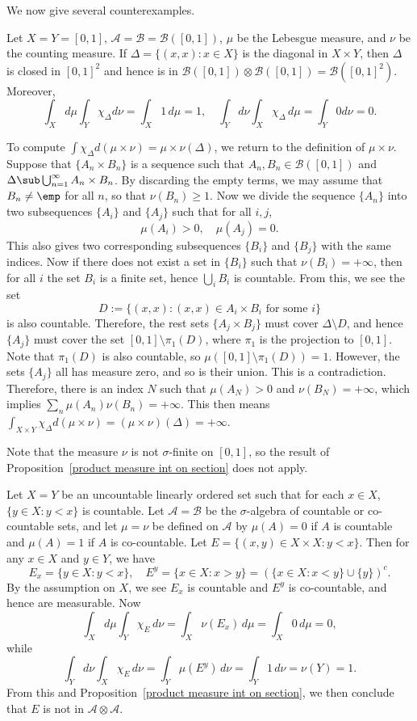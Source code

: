 We now give several counterexamples.
\begin{example}
Let $X=Y=[0,1]$, $\mathcal{A}=\mathcal{B}=\mathcal{B}([0,1])$, $\mu$ be the Lebesgue measure, and $\nu$ be the counting measure. If $\Delta=\{(x,x):x\in X\}$ is the diagonal in $X\times Y$, then $\Delta$ is closed in $[0,1]^2$ and hence is in $\mathcal{B}([0,1])\otimes\mathcal{B}([0,1])=\mathcal{B}([0,1]^2)$. Moreover,
\[\int_Xd\mu\int_Y\chi_\Delta d\nu=\int_X1\,d\mu=1,\quad\int_Yd\nu\int_X\chi_\Delta\,d\mu=\int_Y0 d\nu=0.\]

To compute $\int\chi_{\Delta}d(\mu\times\nu)=\mu\times\nu(\Delta)$, we return to the definition of $\mu\times\nu$. Suppose that $\{A_n\times B_n\}$ is a sequence such that $A_n,B_n\in\mathcal{B}([0,1])$ and $\Delta\sub\bigcup_{n=1}^{\infty}A_n\times B_n$. By discarding the empty terms, we may assume that $B_n\neq\emp$ for all $n$, so that $\nu(B_n)\geq 1$. Now we divide the sequence $\{A_n\}$ into two subsequences $\{A_{i}\}$ and $\{A_{j}\}$ such that for all $i,j$,
\[\mu(A_{i})>0,\quad \mu(A_{j})=0.\]
This also gives two corresponding subsequences $\{B_{i}\}$ and $\{B_{j}\}$ with the same indices. Now if there does not exist a set in $\{B_i\}$ such that $\nu(B_{i})=+\infty$, then for all $i$ the set $B_i$ is a finite set, hence $\bigcup_iB_i$ is countable. From this, we see the set
\[D:=\{(x,x):(x,x)\in A_i\times B_i\text{ for some $i$}\}\]
is also countable.
Therefore, the rest sets $\{A_j\times B_j\}$ must cover $\Delta\setminus D$, and hence $\{A_j\}$ must cover the set $[0,1]\setminus\pi_1(D)$, where $\pi_1$ is the projection to $[0,1]$. Note that $\pi_1(D)$ is also countable, so $\mu([0,1]\setminus\pi_1(D))=1$. However, the sets $\{A_j\}$ all has measure zero, and so is their union. This is a contradiction. Therefore, there is an index $N$ such that $\mu(A_N)>0$ and $\nu(B_N)=+\infty$, which implies $\sum_n\mu(A_n)\nu(B_n)=+\infty$. This then means $\int_{X\times Y}\chi_{\Delta}d(\mu\times\nu)=(\mu\times\nu)(\Delta)=+\infty$. \par
Note that the measure $\nu$ is not $\sigma$-finite on $[0,1]$, so the result of Proposition~\ref{product measure int on section} does not apply.
\end{example}
\begin{example}
Let $X=Y$ be an uncountable linearly ordered set such that for each $x\in X$, $\{y\in X:y<x\}$ is countable. Let $\mathcal{A}=\mathcal{B}$ be the $\sigma$-algebra of countable or co-countable sets, and let $\mu=\nu$ be defined on $\mathcal{A}$ by $\mu(A)=0$ if $A$ is countable and $\mu(A)=1$ if $A$ is co-countable. Let $E=\{(x,y)\in X\times X:y<x\}$. Then for any $x\in X$ and $y\in Y$, we have
\[E_x=\{y\in X:y<x\},\quad E^y=\{x\in X:x>y\}=(\{x\in X:x<y\}\cup\{y\})^c.\]
By the assumption on $X$, we see $E_x$ is countable and $E^y$ is co-countable, and hence are measurable. Now
\[\int_Xd\mu\int_Y\chi_E\,d\nu=\int_X\nu(E_x)\,d\mu=\int_X0\,d\mu=0,\]
while
\[\int_Yd\nu\int_X\chi_E\,d\nu=\int_Y\mu(E^y)\,d\nu=\int_Y1\,d\nu=\nu(Y)=1.\]
From this and Proposition~\ref{product measure int on section}, we then conclude that $E$ is not in $\mathcal{A}\otimes\mathcal{A}$.
\end{example}
